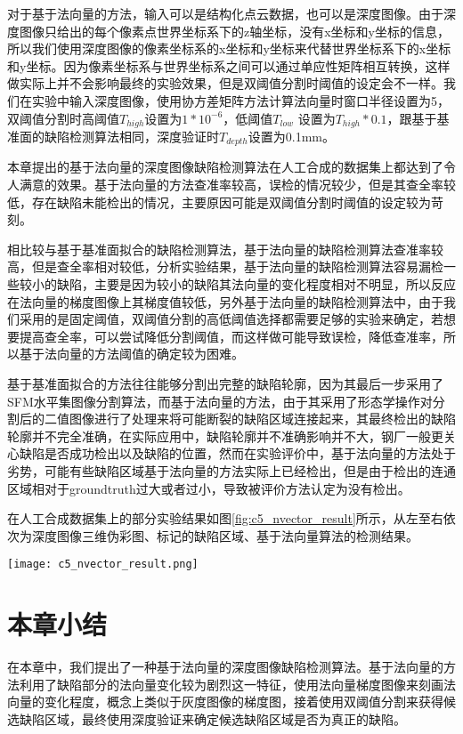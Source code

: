         对于基于法向量的方法，输入可以是结构化点云数据，也可以是深度图像。由于深度图像只给出的每个像素点世界坐标系下的z轴坐标，没有x坐标和y坐标的信息，所以我们使用深度图像的像素坐标系的x坐标和y坐标来代替世界坐标系下的x坐标和y坐标。因为像素坐标系与世界坐标系之间可以通过单应性矩阵相互转换，这样做实际上并不会影响最终的实验效果，但是双阈值分割时阈值的设定会不一样。我们在实验中输入深度图像，使用协方差矩阵方法计算法向量时窗口半径设置为5，双阈值分割时高阈值$T_{high}$设置为$1*{10}^{-6}$，低阈值$T_{low}$ 设置为$T_{high}*0.1$，跟基于基准面的缺陷检测算法相同，深度验证时$T_{depth}$设置为0.1mm。

        本章提出的基于法向量的深度图像缺陷检测算法在人工合成的数据集上都达到了令人满意的效果。基于法向量的方法查准率较高，误检的情况较少，但是其查全率较低，存在缺陷未能检出的情况，主要原因可能是双阈值分割时阈值的设定较为苛刻。

        相比较与基于基准面拟合的缺陷检测算法，基于法向量的缺陷检测算法查准率较高，但是查全率相对较低，分析实验结果，基于法向量的缺陷检测算法容易漏检一些较小的缺陷，主要是因为较小的缺陷其法向量的变化程度相对不明显，所以反应在法向量的梯度图像上其梯度值较低，另外基于法向量的缺陷检测算法中，由于我们采用的是固定阈值，双阈值分割的高低阈值选择都需要足够的实验来确定，若想要提高查全率，可以尝试降低分割阈值，而这样做可能导致误检，降低查准率，所以基于法向量的方法阈值的确定较为困难。

        基于基准面拟合的方法往往能够分割出完整的缺陷轮廓，因为其最后一步采用了SFM水平集图像分割算法，而基于法向量的方法，由于其采用了形态学操作对分割后的二值图像进行了处理来将可能断裂的缺陷区域连接起来，其最终检出的缺陷轮廓并不完全准确，在实际应用中，缺陷轮廓并不准确影响并不大，钢厂一般更关心缺陷是否成功检出以及缺陷的位置，然而在实验评价中，基于法向量的方法处于劣势，可能有些缺陷区域基于法向量的方法实际上已经检出，但是由于检出的连通区域相对于groundtruth过大或者过小，导致被评价方法认定为没有检出。

        在人工合成数据集上的部分实验结果如图\ref{fig:c5_nvector_result}所示，从左至右依次为深度图像三维伪彩图、标记的缺陷区域、基于法向量算法的检测结果。

        \begin{figure*}[!h]
        \centering
        \texttt{[image: c5\_nvector\_result.png]}
        \caption{基于法向量方法的部分实验结果}
        \label{fig:c5_nvector_result}
        \end{figure*}

    \section{本章小结}
    在本章中，我们提出了一种基于法向量的深度图像缺陷检测算法。基于法向量的方法利用了缺陷部分的法向量变化较为剧烈这一特征，使用法向量梯度图像来刻画法向量的变化程度，概念上类似于灰度图像的梯度图，接着使用双阈值分割来获得候选缺陷区域，最终使用深度验证来确定候选缺陷区域是否为真正的缺陷。

